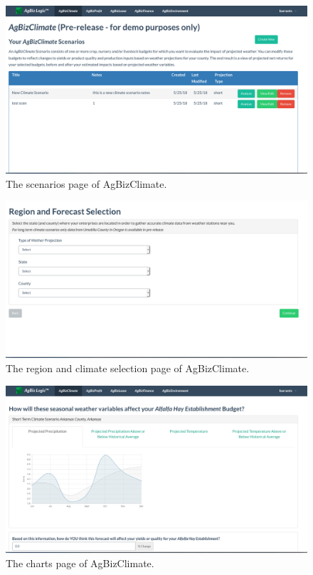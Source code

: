 \documentclass[onecolumn, draftclsnofoot,10pt, compsoc]{article}
\begin{document}
        \begin{figure}[h!]
            \includegraphics[width=18cm]{./Images/AgBizScenarios.png}
            \caption{The scenarios page of AgBizClimate.}
        \end{figure}
    
        
        \begin{figure}[h!]
            \includegraphics[width=18cm]{./Images/RegionSelect.png}
            \caption{The region and climate selection page of AgBizClimate.}
        \end{figure}
            
        \begin{figure}[h!]
            \includegraphics[width=18cm]{./Images/ChartsPage.png}
            \caption{The charts page of AgBizClimate.}
        \end{figure}
        
\end{document}
